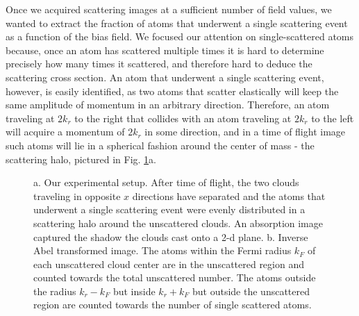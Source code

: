 \documentclass[12pt]{iopart}
\begin{document}
\par Once we acquired scattering images at a sufficient number of field values, we wanted to extract the fraction of atoms that underwent a single scattering event as a function of the bias field. We focused our attention on single-scattered atoms because, once an atom has scattered multiple times it is hard to determine precisely how many times it scattered, and therefore hard to deduce the scattering cross section.  An atom that underwent a single scattering event, however, is easily identified, as two atoms that scatter elastically will keep the same amplitude of momentum in an arbitrary direction. Therefore, an atom traveling at $2k_r$ to the right that collides with an atom traveling at $2k_r$ to the left will acquire a momentum of $2k_r$ in some direction, and in a time of flight image such atoms will lie in a spherical fashion around the center of mass -  the scattering halo, pictured in Fig. \ref{fig:halo}a. 
\begin{figure}
\caption{a. Our experimental setup. After time of flight, the two clouds traveling in opposite $x$ directions have separated and the atoms that underwent a single scattering event were evenly distributed in a scattering halo around the unscattered clouds. An absorption image captured the shadow the clouds cast onto a 2-d plane. b. Inverse Abel transformed image. The atoms within the Fermi radius $k_F$ of each unscattered cloud center are in the unscattered region and counted towards the total unscattered number. The atoms outside the radius $k_r-k_F$ but inside $k_r+k_F$ but outside the unscattered region are counted towards the number of single scattered atoms.   }  
\label{fig:halo}
\end{figure}
\end{document}
